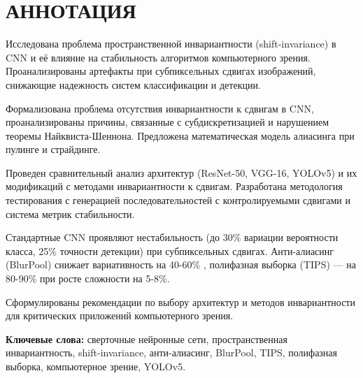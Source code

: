 \newpage
\section*{АННОТАЦИЯ}
\thispagestyle{empty}

Исследована проблема пространственной инвариантности (shift-invariance) в CNN и её влияние на стабильность алгоритмов компьютерного зрения. Проанализированы артефакты при субпиксельных сдвигах изображений, снижающие надежность систем классификации и детекции.

Формализована проблема отсутствия инвариантности к сдвигам в CNN, проанализированы причины, связанные с субдискретизацией и нарушением теоремы Найквиста-Шеннона. Предложена математическая модель алиасинга при пулинге и страйдинге.

Проведен сравнительный анализ архитектур (ResNet-50, VGG-16, YOLOv5) и их модификаций с методами инвариантности к сдвигам. Разработана методология тестирования с генерацией последовательностей с контролируемыми сдвигами и система метрик стабильности.

Стандартные CNN проявляют нестабильность (до 30\% вариации вероятности класса, 25\% точности детекции) при субпиксельных сдвигах. Анти-алиасинг (BlurPool) снижает вариативность на 40-60\% \cite{Zhang2019blurpool}, полифазная выборка (TIPS) — на 80-90\% \cite{saha2024tips} при росте сложности на 5-8\%.

Сформулированы рекомендации по выбору архитектур и методов инвариантности для критических приложений компьютерного зрения.

\bigskip
\textbf{Ключевые слова:} сверточные нейронные сети, пространственная инвариантность, shift-invariance, анти-алиасинг, BlurPool, TIPS, полифазная выборка, компьютерное зрение, YOLOv5.

\newpage